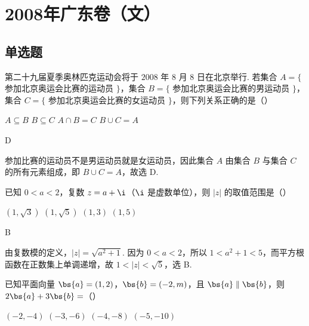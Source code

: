 \chapter{2008年广东卷（文）}

\section{单选题}

\begin{problem}
第二十九届夏季奥林匹克运动会将于 \(2008\) 年 \(8\) 月 \(8\) 日在北京举行. 若集合 \(A = \{\) 参加北京奥运会比赛的运动员 \(\}\)，集合 \(B = \{\) 参加北京奥运会比赛的男运动员 \(\}\)，集合 \(C = \{\) 参加北京奥运会比赛的女运动员 \(\}\)，则下列关系正确的是（\quad）

\choices
    {\(A \subseteq B\)}
    {\(B \subseteq C\)}
    {\(A \cap B = C\)}
    {\(B \cup C = A\)}
\end{problem}

\begin{answer}
D
\end{answer}

\begin{solution}
参加比赛的运动员不是男运动员就是女运动员，因此集合 \(A\) 由集合 \(B\) 与集合 \(C\) 的所有元素组成，即 \(B\cup C=A\)，故选 D.
\end{solution}

\begin{problem}
已知 \(0 < a < 2\)，复数 \(z = a + \i\)（\(\i\) 是虚数单位），则 \(|z|\) 的取值范围是（\quad）

\choices
    {\((1, \sqrt{3})\)}
    {\((1, \sqrt{5})\)}
    {\((1, 3)\)}
    {\((1, 5)\)}
\end{problem}

\begin{answer}
B
\end{answer}

\begin{solution}
由复数模的定义，\(|z|=\sqrt{a^2+1}\). 因为 \(0<a<2\)，所以 \(1<a^2+1<5\)，而平方根函数在正数集上单调递增，故 \(1<|z|<\sqrt{5}\)，选 B.
\end{solution}

\begin{problem}
已知平面向量 \(\bs{a} = (1, 2)\)，\(\bs{b} = (-2, m)\)，且 \(\bs{a} \parallel \bs{b}\)，则 \(2\bs{a} + 3\bs{b} =\)（\quad）

\choices
    {\((-2, -4)\)}
    {\((-3, -6)\)}
    {\((-4, -8)\)}
    {\((-5, -10)\)}
\end{problem}

